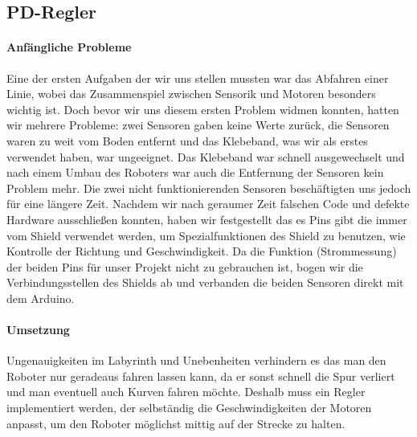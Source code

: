 \documentclass[12pt]{article}
\begin{document}
\subsection{PD-Regler}
\paragraph{Anfängliche Probleme} Eine der ersten Aufgaben der wir uns stellen mussten war das Abfahren einer Linie, wobei das Zusammenspiel zwischen Sensorik und Motoren besonders wichtig ist. Doch bevor wir uns diesem ersten Problem widmen konnten, hatten wir mehrere Probleme: zwei Sensoren gaben keine Werte zurück, die Sensoren waren zu weit vom Boden entfernt und das Klebeband, was wir als erstes verwendet haben, war ungeeignet. Das Klebeband war schnell ausgewechselt und nach einem Umbau des Roboters war auch die Entfernung der Sensoren kein Problem mehr. Die zwei nicht funktionierenden Sensoren beschäftigten uns jedoch für eine längere Zeit. Nachdem wir nach geraumer Zeit falschen Code und defekte Hardware ausschließen konnten, haben wir festgestellt das es Pins gibt die immer vom Shield verwendet werden, um Spezialfunktionen des Shield zu benutzen, wie Kontrolle der Richtung und Geschwindigkeit. Da die Funktion (Strommessung) der beiden  Pins für unser Projekt nicht zu gebrauchen ist, bogen wir die Verbindungsstellen des Shields ab und verbanden die beiden Sensoren direkt mit dem Arduino.
\paragraph{Umsetzung} Ungenauigkeiten im Labyrinth und Unebenheiten verhindern es das man den Roboter nur geradeaus fahren lassen kann, da er sonst schnell die Spur verliert und man eventuell auch Kurven fahren möchte. Deshalb muss ein Regler implementiert werden, der selbständig die Geschwindigkeiten der Motoren anpasst, um den Roboter möglichst mittig auf der Strecke zu halten. 
\end{document}
